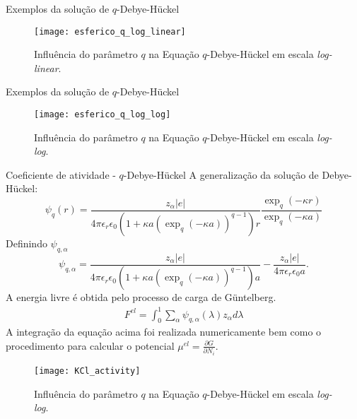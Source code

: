 \documentclass{beamer}
\begin{document}
\begin{frame}{Exemplos da solução de $q$-Debye-H\"{u}ckel}
\begin{figure}
\centering
  \texttt{[image: esferico\_q\_log\_linear]}
	\caption{Influência do parâmetro $q$ na Equação $q$-Debye-H\"{u}ckel em escala {\it log-linear}.}
\end{figure}
\end{frame}

\begin{frame}{Exemplos da solução de $q$-Debye-H\"{u}ckel}
\begin{figure}
\centering
  \texttt{[image: esferico\_q\_log\_log]}
	\caption{Influência do parâmetro $q$ na Equação $q$-Debye-H\"{u}ckel em escala {\it log-log}.}
\end{figure}
\end{frame}

\begin{frame}{Coeficiente de atividade -  $q$-Debye-H\"{u}ckel}
	A generalização da solução de Debye-H\"{u}ckel:
	\begin{equation}
		\psi_q(r) = \frac{z_{\alpha}|e|}{4\pi \epsilon_r \epsilon_0 (1+\kappa a( \exp_q(-\kappa a))^{q-1})r}\frac{\exp_q(-\kappa r)}{\exp_q(-\kappa a)} 
        \end{equation}
	Definindo $\psi_{q,\alpha}$
	\begin{equation}
		\psi_{q,\alpha} = \frac{z_{\alpha}|e|}{4\pi \epsilon_r \epsilon_0 (1+\kappa a( \exp_q(-\kappa a))^{q-1})a} 
		- \frac{z_{\alpha}|e|}{ 4\pi \epsilon_r \epsilon_0 a}.  
	\end{equation}
	A energia livre é obtida pelo processo de carga de G\"{u}ntelberg.
	\begin{eqnarray}
		F^{el} = \int_{0}^{1} \sum_{\alpha}\psi_{q,\alpha}(\lambda)z_{\alpha}d\lambda 
	\end{eqnarray}
	A integração da equação acima foi realizada numericamente bem como o procedimento para calcular o potencial 
	$\mu^{el} = \frac{\partial G }{\partial N_i}$.  
\end{frame}

\begin{frame}
\begin{figure}
\centering
  \texttt{[image: KCl\_activity]}
	\caption{Influência do parâmetro $q$ na Equação $q$-Debye-H\"{u}ckel em escala {\it log-log}.}
\end{figure}

\end{frame}
\end{document}
